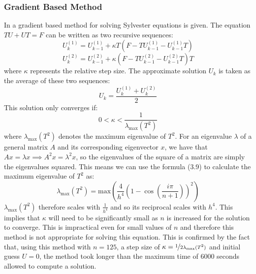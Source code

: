 \documentclass[11pt]{article}
\numberwithin{equation}{section}
\begin{document}
\subsubsection{Gradient Based Method}
In \cite{Zhou} a gradient based method for solving Sylvester equations is given. The equation $TU + UT = F$ can be written as two recursive sequences:
	\begin{equation}
	U_k^{(1)} = U_{k-1}^{(1)} + \kappa T(F-TU_{k-1}^{(1)} - U_{k-1}^{(1)}T)
	\end{equation}
	\begin{equation}
	U_k^{(2)} = U_{k-1}^{(2)} + \kappa (F-TU_{k-1}^{(2)} - U_{k-1}^{(2)}T)T
	\end{equation}
where $\kappa$ represents the relative step size. The approximate solution $U_k$ is taken as the average of these two sequences:
	\begin{equation}
	U_k = \frac{U_k^{(1)} + U_k^{(2)}}{2}
	\end{equation}
This solution only converges if:
	\begin{equation}
	0 < \kappa < \frac{1}{\lambda_{\text{max}}(T^2)} 
	\end{equation}
where $\lambda_{\text{max}}(T^2)$ denotes the maximum eigenvalue of $T^2$. For an eigenvalue $\lambda$ of a general matrix $A$ and its corresponding eigenvector $x$, we have that $Ax = \lambda x \implies A^2 x = \lambda^2 x$, so the eigenvalues of the square of a matrix are simply the eigenvalues squared. This means we can use the formula (3.9) to calculate the maximum eigenvalue of $T^2$ as:
\begin{equation}
\lambda_{\text{max}}(T^2) = \text{max} \left( \frac{4}{h^4}  \left( 1 - \cos \left(\frac{i \pi}{n+1} \right) \right)^2 \right)
\end{equation}
$\lambda_{\text{max}}(T^2)$ therefore scales with $\frac{1}{h^4}$ and so its reciprocal scales with $h^4$. This implies that $\kappa$ will need to be significantly small as $n$ is increased for the solution to converge. This is impractical even for small values of $n$ and therefore this method is not appropriate for solving this equation. This is confirmed by the fact that, using this method with $n=125$, a step size of $\kappa = \nicefrac{1}{2 \lambda_{\text{max}}(T^2)}$ and initial guess $U=0$, the method took longer than the maximum time of 6000 seconds allowed to compute a solution.
\end{document}
